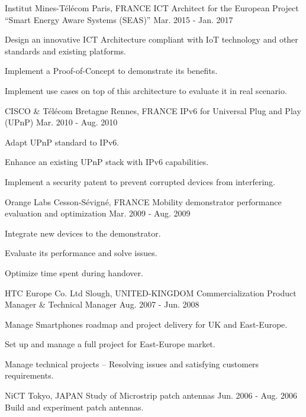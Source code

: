 \begin{cventries}
  \cventry
    {Institut Mines-T\'{e}l\'{e}com}
    {Paris, FRANCE}
    {ICT Architect for the European Project ``Smart Energy Aware Systems (SEAS)''}
    {Mar. 2015 - Jan. 2017}
    {
      \begin{cvitems}
        \item {Design an innovative ICT Architecture compliant with IoT technology and other standards and existing platforms.}
        \item {Implement a Proof-of-Concept to demonstrate its benefits.}
        \item {Implement use cases on top of this architecture to evaluate it in real scenario.}
      \end{cvitems}
    }
  \cventry
    {CISCO \& T\'{e}l\'{e}com Bretagne}
    {Rennes, FRANCE}
    {IPv6 for Universal Plug and Play (UPnP)}
    {Mar. 2010 - Aug. 2010}
    {
      \begin{cvitems}
        \item {Adapt UPnP standard to IPv6.}
        \item {Enhance an existing UPnP stack with IPv6 capabilities.}
        \item {Implement a security patent to prevent corrupted devices from interfering.}
      \end{cvitems}
    }
  \cventry
    {Orange Labs}
    {Cesson-S\'{e}vign\'{e}, FRANCE}
    {Mobility demonstrator performance evaluation and optimization}
    {Mar. 2009 - Aug. 2009}
    {
      \begin{cvitems}
        \item {Integrate new devices to the demonstrator.}
        \item {Evaluate its performance and solve issues.}
        \item {Optimize time spent during handover.}
      \end{cvitems} 
    }
  \cventry
    {HTC Europe Co. Ltd}
    {Slough, UNITED-KINGDOM}
    {Commercialization Product Manager \& Technical Manager}
    {Aug. 2007 - Jun. 2008}
    {
      \begin{cvitems}
        \item {Manage Smartphones roadmap and project delivery for UK and East-Europe.}
        \item {Set up and manage a full project for East-Europe market.}
        \item {Manage technical projects -- Resolving issues and satisfying customers requirements.}
      \end{cvitems}
    }
  \cventry
    {NiCT}
    {Tokyo, JAPAN}
    {Study of Microstrip patch antennas}
    {Jun. 2006 - Aug. 2006}
    {\quad \quad Build and experiment patch antennas.}
  
\end{cventries}
